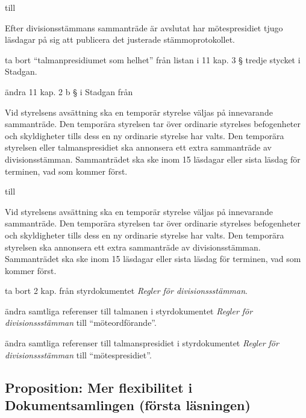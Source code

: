 \documentclass[protokoll]{dvd}
\begin{document}
\begin{attsatser}
	till

	\begin{displayquote}
		Efter divisionsstämmans sammanträde är avslutat har mötespresidiet tjugo läsdagar på sig att publicera det justerade stämmoprotokollet.
	\end{displayquote}

	\item ta bort ``talmanpresidiumet som helhet'' från listan i 11 kap. 3 § tredje stycket i Stadgan.

	\item ändra 11 kap. 2 b § i Stadgan från

	\begin{displayquote}
		Vid styrelsens avsättning ska en temporär styrelse väljas på innevarande sammanträde.
		Den temporära styrelsen tar över ordinarie styrelses befogenheter och skyldigheter tills dess en ny ordinarie styrelse har valts.
		Den temporära styrelsen eller talmanspresidiet ska annonsera ett extra sammanträde av divisionsstämman.
		Sammanträdet ska ske inom 15 läsdagar eller sista läsdag för terminen, vad som kommer först.
	\end{displayquote}

	till

	\begin{displayquote}
		Vid styrelsens avsättning ska en temporär styrelse väljas på innevarande sammanträde.
		Den temporära styrelsen tar över ordinarie styrelses befogenheter och skyldigheter tills dess en ny ordinarie styrelse har valts.
		Den temporära styrelsen ska annonsera ett extra sammanträde av divisionsstämman.
		Sammanträdet ska ske inom 15 läsdagar eller sista läsdag för terminen, vad som kommer först.
	\end{displayquote}

	\item ta bort 2 kap. från styrdokumentet \emph{Regler för divisionssstämman}.

	\item ändra samtliga referenser till talmanen i styrdokumentet \emph{Regler för divisionssstämman} till ``möteordförande''.

	\item ändra samtliga referenser till talmanspresidiet i styrdokumentet \emph{Regler för divisionssstämman} till ``mötespresidiet''.	
\end{attsatser}

\newpage
\subsection{Proposition: Mer flexibilitet i Dokumentsamlingen (första läsningen)}
\end{document}
